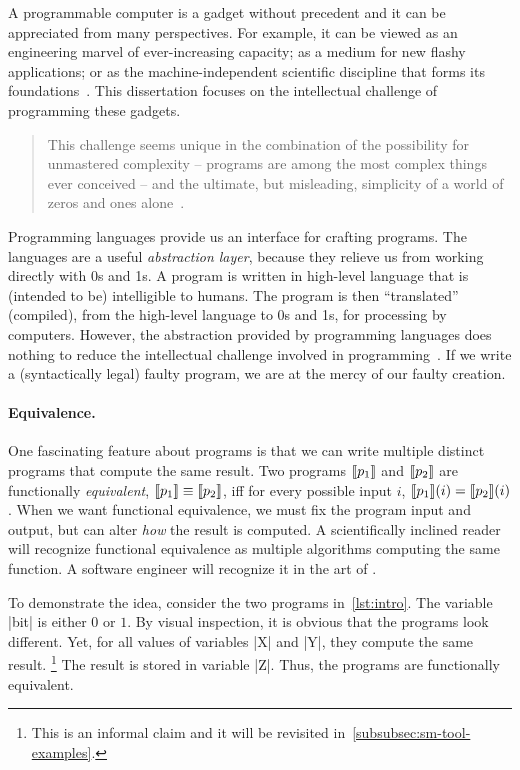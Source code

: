 A programmable computer is a gadget without precedent and it can be appreciated
from many perspectives. For example, it can be viewed as an engineering marvel
of ever-increasing capacity; as a medium for new flashy applications; or as the
machine-independent scientific discipline that forms its
foundations~\cite{dijkstra1979a,hoare2006}. This dissertation focuses on the
intellectual challenge of programming these gadgets.

\begin{quotation}
\noindent This challenge seems unique in the combination of the possibility for
unmastered complexity -- programs are among the most complex things ever
conceived -- and the ultimate, but misleading, simplicity of a world of zeros
and ones alone~\cite{dijkstra1979a}.
\end{quotation}

Programming languages provide us an interface for crafting programs.
The languages are a useful \emph{abstraction layer}, because they relieve us from working directly with 0s and 1s.
A program is written in {high-level} language that is (intended to be) intelligible to humans.
The program is then \enquote{translated} (compiled), from the high-level language to 0s and 1s, for processing by computers.
However, the abstraction provided by programming languages does nothing to reduce the intellectual challenge involved in programming~\cite{dijkstra1979b}.
If we write a (syntactically legal) faulty program, we are at the mercy of our faulty creation.

\paragraph{Equivalence.}
One fascinating feature about programs is that we can write multiple distinct programs that compute the same result.
Two programs $\llbracket p_1\rrbracket$ and $\llbracket p_2\rrbracket$ are functionally \emph{equivalent}, \ie \(\llbracket p_1\rrbracket \equiv \llbracket p_2\rrbracket\), iff for every possible input \(i\), \(\llbracket p_1\rrbracket(i) = \llbracket p_2\rrbracket(i)\).
When we want functional equivalence, we must fix the program input and output, but can alter \emph{how} the result is computed.
A scientifically inclined reader will recognize functional equivalence as multiple algorithms computing the same function.
A software engineer will recognize it in the art of .

To demonstrate the idea, consider the two programs in~\autoref{lst:intro}.
The variable \pr|bit| is either \(0\) or \(1\).
By visual inspection, it is obvious that the programs look different.
Yet, for all values of variables \pr|X| and \pr|Y|, they compute the same result.%
\footnote{This is an informal claim and it will be revisited in~\autoref{subsubsec:sm-tool-examples}.}
The result is stored in variable \pr|Z|.
Thus, the programs are functionally equivalent.


